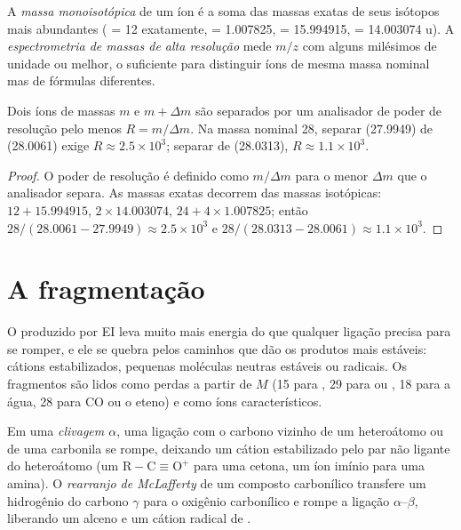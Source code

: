 \begin{definition}\label{def:b2:mass-spec-atomic:exact-mass}
A \emph{massa monoisotópica} de um íon é a soma das massas exatas de seus
isótopos mais abundantes ( = 12 exatamente,  = 1.007825,  = 15.994915,
 = 14.003074 u). A \emph{espectrometria de massas de alta resolução}
mede $m/z$ com alguns milésimos de unidade ou melhor, o suficiente para distinguir íons de mesma
massa nominal mas de fórmulas diferentes.
\end{definition}

\begin{proposition}\label{prop:b2:mass-spec-atomic:resolving}
Dois íons de massas $m$ e $m + \Delta m$ são separados por um analisador de poder de resolução pelo menos
$R = m/\Delta m$. Na massa nominal 28, separar  (27.9949) de  (28.0061) exige $R
\approx 2.5 \times 10^3$; separar  de  (28.0313), $R \approx 1.1 \times 10^3$.
\end{proposition}

\begin{proof}
O poder de resolução é definido como $m/\Delta m$ para o menor $\Delta m$ que o analisador separa. As
massas exatas decorrem das massas isotópicas: $12 + 15.994915$, $2 \times 14.003074$, $24 + 4 \times
1.007825$; então $28/(28.0061 - 27.9949) \approx 2.5 \times 10^3$ e $28/(28.0313 - 28.0061) \approx
1.1 \times 10^3$.
\end{proof}

\section{A fragmentação}

O  produzido por EI leva muito mais energia do que qualquer ligação precisa para se romper, e
ele se quebra pelos caminhos que dão os produtos mais estáveis: cátions estabilizados, pequenas moléculas
neutras estáveis ou radicais. Os fragmentos são lidos como perdas a partir de $M$ (15 para , 29
para  ou , 18 para a água, 28 para CO ou o eteno) e como íons característicos.

\begin{definition}\label{def:b2:mass-spec-atomic:fragmentation}
Em uma \emph{clivagem $\alpha$}, uma ligação com o carbono vizinho de um
heteroátomo ou de uma carbonila se rompe, deixando um cátion estabilizado pelo par não ligante do
heteroátomo (um  $\mathrm{R{-}C{\equiv}O^+}$ para uma cetona, um íon imínio para uma amina). O
\emph{rearranjo de McLafferty} de um composto carbonílico transfere um hidrogênio do
carbono $\gamma$ para o oxigênio carbonílico e rompe a ligação $\alpha$--$\beta$, liberando um alceno e
um cátion radical de .
\end{definition}

